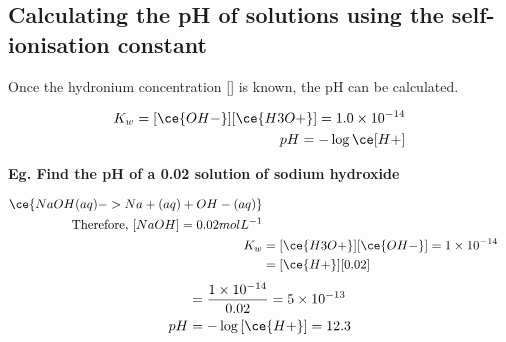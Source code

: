 	\subsection{Calculating the pH of solutions using the self-ionisation constant}
		
		Once the hydronium concentration [] is known, the pH can be calculated.

		\begin{align*}
			K_w = [\ce{OH-}][\ce{H3O+}] = 1.0 \times 10^{-14} \\
			pH = - \log{\ce[H+]}
		\end{align*}

		\textbf{Eg. Find the pH of a 0.02 \si{\molar} solution of sodium hydroxide}

			\begin{align*}
				\ce{NaOH(aq) -> Na+(aq) + OH-(aq)} \\
				\text{Therefore, }[NaOH] = 0.02 mol L^{-1} \\
				K_w &= [\ce{H3O+}][\ce{OH-}] = 1 \times 10^{-14} \\
				    &= [\ce{H+}][0.02]
			\end{align*}
			\begin{align*}
				[\ce{H+}] &= \frac{1 \times 10^{-14}}{0.02} = 5 \times 10^{-13} \\
				pH &= - \log{[\ce{H+}]} = 12.3
			\end{align*}
